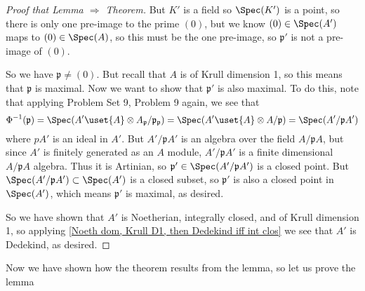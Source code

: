 \documentclass[12 pt]{article}
\theoremstyle{definition}
\renewcommand{\(}{\left(}
\renewcommand{\)}{\right)}
\newcommand\fp{{\mathfrak p}}
\begin{document}
\begin{proof}[Proof that Lemma $\Rightarrow$ Theorem]
But $K'$ is a field so $\Spec(K')$ is a point, so there is only one pre-image to the prime $(0)$, but we know $(0) \in \Spec(A')$ maps to $(0) \in \Spec(A)$, so this must be the one pre-image, so $\fp'$ is not a pre-image of $(0)$.

So we have $\fp \neq (0)$. But recall that $A$ is of Krull dimension 1, so this means that $\fp$ is maximal. Now we want to show that $\fp'$ is also maximal.  To do this, note that applying Problem Set 9, Problem 9 again, we see that \[\Phi^{-1}(\fp)=\Spec(A' \uset{A}\otimes A_{\fp}/\fp_{\fp})=\Spec(A' \uset{A}\otimes A/\fp)=\Spec(A'/\fp A')\]
where $pA'$ is an ideal in $A'$. But $A'/\fp A'$ is an algebra over the field $A/\fp A$, but since $A'$ is finitely generated as an $A$ module, $A'/\fp A'$ is a finite dimensional $A/\fp A$ algebra. Thus it is Artinian, so $\fp' \in \Spec(A'/\fp A')$ is a closed point. But $\Spec(A'/\fp A') \subset \Spec(A')$ is a closed subset, so $\fp'$ is also a closed point in $\Spec(A')$, which means $\fp'$ is maximal, as desired.

So we have shown that $A'$ is Noetherian, integrally closed, and of Krull dimension 1, so applying
\ref{Noeth dom, Krull D1, then Dedekind iff int clos} we see that $A'$ is Dedekind, as desired.
\end{proof}

Now we have shown how the theorem results from the lemma, so let us prove the lemma
\end{document}

